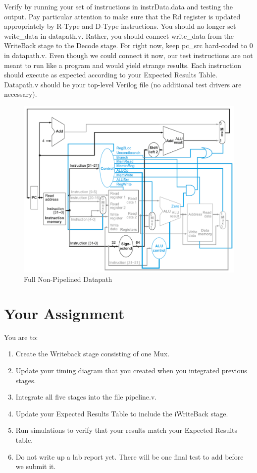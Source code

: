 Verify by running your set of instructions in instrData.data and testing the output.  Pay particular attention to make sure that the Rd register is updated appropriately by R-Type and D-Type instructions.  You should no longer set write\_data in datapath.v.  Rather, you should connect write\_data from the WriteBack stage to the Decode stage.  For right now, keep pc\_src hard-coded to 0 in datapath.v.  Even though we could connect it now, our test instructions are not meant to run like a program and would yield strange results.  Each instruction should execute as expected according to your Expected Results Table.  Datapath.v should be your top-level Verilog file (no additional test drivers are necessary).

\begin{figure}
\caption{Full Non-Pipelined Datapath}\label{fig:datapath}
\begin{center}
\includegraphics[width=\textwidth]{../images/non_pipelined_datapath.png}
\end{center}
\end{figure}

\section{Your Assignment}

You are to:
\begin{enumerate}
\item Create the Writeback stage consisting of one Mux.
\item Update your timing diagram that you created when you integrated previous stages.
\item Integrate all five stages into the file pipeline.v.
\item Update your Expected Results Table to include the iWriteBack stage.
\item Run simulations to verify that your results match your Expected Results table.   
\item Do not write up a lab report yet. There will be one final test to add before we submit it.
\end{enumerate} 
